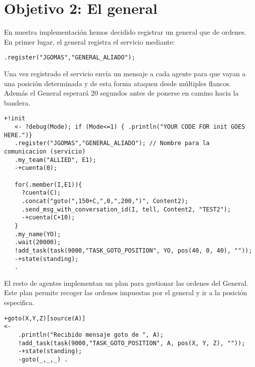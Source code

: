 \documentclass[11pt,oneside,a4paper]{article}
\begin{document}
\section{Objetivo 2: El general}
En nuestra implementación hemos decidido registrar un general que de ordenes. 
En primer lugar, el general registra el servicio mediante:
\begin{verbatim}
.register("JGOMAS","GENERAL_ALIADO");
\end{verbatim}
Una vez registrado el servicio envía un mensaje a cada agente para que vayan a una posición determinada y de esta forma ataquen desde múltiples flancos. Además el General esperará 20 segundos antes de ponerse en camino hacia la bandera.
\begin{verbatim}
+!init
   <- ?debug(Mode); if (Mode<=1) { .println("YOUR CODE FOR init GOES HERE.")}
   .register("JGOMAS","GENERAL_ALIADO"); // Nombre para la comunicacion (servicio)
   .my_team("ALLIED", E1);
   -+cuenta(0);
   
   for(.member(I,E1)){
	 ?cuenta(C);
     .concat("goto(",150+C,",0,",200,")", Content2);
     .send_msg_with_conversation_id(I, tell, Content2, "TEST2");
	 -+cuenta(C+10);
   }
   .my_name(YO);
   .wait(20000);
   !add_task(task(9000,"TASK_GOTO_POSITION", YO, pos(40, 0, 40), ""));
   -+state(standing);
   .
\end{verbatim}
El resto de agentes implementan un plan para gestionar las ordenes del General. Este plan permite recoger las ordenes impuestas por el general y ir a la posición especifica.
\begin{verbatim}
+goto(X,Y,Z)[source(A)]
<-
	.println("Recibido mensaje goto de ", A);
	!add_task(task(9000,"TASK_GOTO_POSITION", A, pos(X, Y, Z), ""));
	-+state(standing);
	-goto(_,_,_) .
\end{verbatim}
\end{document}
